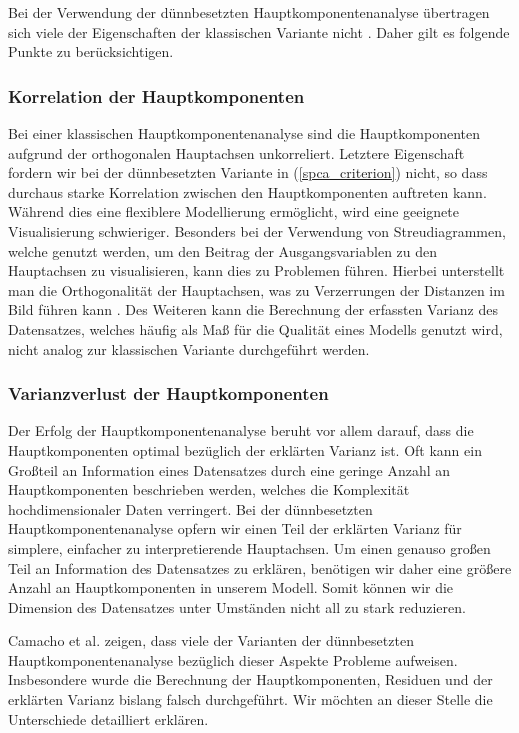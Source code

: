 Bei der Verwendung der dünnbesetzten Hauptkomponentenanalyse übertragen sich viele der Eigenschaften der klassischen Variante nicht \cite{camacho}. Daher gilt es folgende Punkte zu berücksichtigen.

\subsubsection{Korrelation der Hauptkomponenten}

Bei einer klassischen Hauptkomponentenanalyse sind die Hauptkomponenten aufgrund der orthogonalen Hauptachsen unkorreliert. Letztere Eigenschaft fordern wir bei der dünnbesetzten Variante in (\ref{spca_criterion}) nicht, so dass durchaus starke Korrelation zwischen den Hauptkomponenten auftreten kann. Während dies eine flexiblere Modellierung ermöglicht, wird eine geeignete Visualisierung schwieriger. Besonders bei der Verwendung von Streudiagrammen, welche genutzt werden, um den Beitrag der Ausgangsvariablen zu den Hauptachsen zu visualisieren, kann dies zu Problemen führen. Hierbei unterstellt man die Orthogonalität der Hauptachsen, was zu Verzerrungen der Distanzen im Bild führen kann \cite{geladi}. Des Weiteren kann die Berechnung der erfassten Varianz des Datensatzes, welches häufig als Maß für die Qualität eines Modells genutzt wird, nicht analog zur klassischen Variante durchgeführt werden.

\subsubsection{Varianzverlust der Hauptkomponenten}

Der Erfolg der Hauptkomponentenanalyse beruht vor allem darauf, dass die Hauptkomponenten optimal bezüglich der erklärten Varianz ist. Oft kann ein Großteil an Information eines Datensatzes durch eine geringe Anzahl an Hauptkomponenten beschrieben werden, welches die Komplexität hochdimensionaler Daten verringert. Bei der dünnbesetzten Hauptkomponentenanalyse opfern wir einen Teil der erklärten Varianz für simplere, einfacher zu interpretierende Hauptachsen. Um einen genauso großen Teil an Information des Datensatzes zu erklären, benötigen wir daher eine größere Anzahl an Hauptkomponenten in unserem Modell. Somit können wir die Dimension des Datensatzes unter Umständen nicht all zu stark reduzieren.

Camacho et al. zeigen, dass viele der Varianten der dünnbesetzten Hauptkomponentenanalyse bezüglich dieser Aspekte Probleme aufweisen. Insbesondere wurde die Berechnung der Hauptkomponenten, Residuen und der erklärten Varianz bislang falsch durchgeführt. Wir möchten an dieser Stelle die Unterschiede detailliert erklären.

